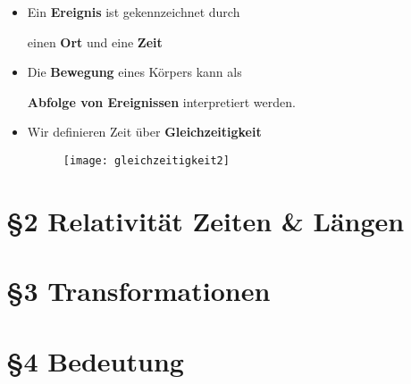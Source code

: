 \documentclass[]{beamer}%
\begin{document}
\begin{frame}
    \begin{itemize}
        \item Ein \textbf{Ereignis} ist gekennzeichnet durch\\
            \begin{center}
                einen \textbf{Ort} und eine \textbf{Zeit}
            \end{center}
    \end{itemize}
\end{frame}

\begin{frame}
    \begin{itemize}
        \item Die \textbf{Bewegung} eines Körpers kann als\\
            \begin{center}
                \textbf{Abfolge von Ereignissen} interpretiert werden.
            \end{center}
    \end{itemize}
\end{frame}

\begin{frame}
    \begin{itemize}
        \item Wir definieren Zeit über \textbf{Gleichzeitigkeit}\\
            \vspace{5pt}
            \begin{figure}[h]
                    \centering
                    \texttt{[image: gleichzeitigkeit2]}\\
            \end{figure}
    \end{itemize}
\end{frame}


\section{§2 Relativität Zeiten \& Längen}
\begin{frame}
\end{frame}

\section{§3 Transformationen}
\begin{frame}
\end{frame}

\section{§4 Bedeutung}
\begin{frame}
\end{frame}
\end{document}
